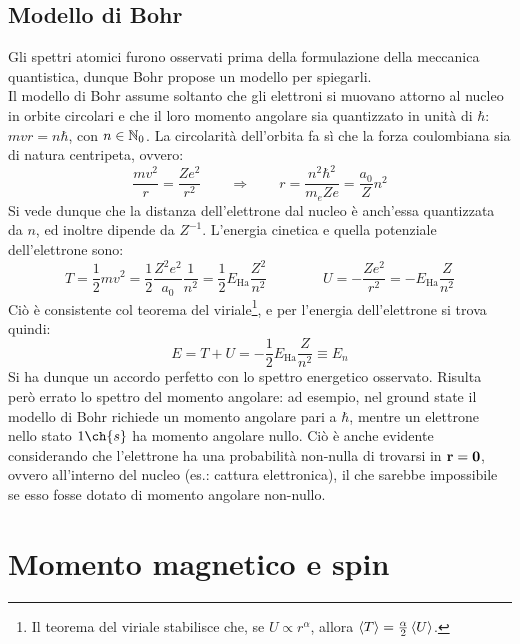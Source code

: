\subsection{Modello di Bohr}

Gli spettri atomici furono osservati prima della formulazione della meccanica quantistica, dunque Bohr propose un modello per spiegarli.\\
Il modello di Bohr assume soltanto che gli elettroni si muovano attorno al nucleo in orbite circolari e che il loro momento angolare sia quantizzato in unità di $ \hbar $: $ mvr = n\hbar $, con $ n \in \mathbb{N}_0 $. La circolarità dell'orbita fa sì che la forza coulombiana sia di natura centripeta, ovvero:
\begin{equation*}
	\frac{mv^2}{r} = \frac{Ze^2}{r^2}
	\qquad \Rightarrow \qquad
	r = \frac{n^2 \hbar^2}{m_e Z e} = \frac{a_0}{Z} n^2
\end{equation*}
Si vede dunque che la distanza dell'elettrone dal nucleo è anch'essa quantizzata da $ n $, ed inoltre dipende da $ Z^{-1} $. L'energia cinetica e quella potenziale dell'elettrone sono:
\begin{equation*}
	T = \frac{1}{2} m v^2 = \frac{1}{2} \frac{Z^2 e^2}{a_0} \frac{1}{n^2} = \frac{1}{2} E_\text{Ha} \frac{Z^2}{n^2}
	\qquad \qquad
	U = - \frac{Z e^2}{r^2} = - E_\text{Ha} \frac{Z}{n^2}
\end{equation*}
Ciò è consistente col teorema del viriale\footnote{Il teorema del viriale stabilisce che, se $ U \propto r^\alpha $, allora $ \braket{T} = \frac{\alpha}{2} \braket{U} $.}, e per l'energia dell'elettrone si trova quindi:
\begin{equation*}
	E = T + U = - \frac{1}{2} E_\text{Ha} \frac{Z}{n^2} \equiv E_n
\end{equation*}
Si ha dunque un accordo perfetto con lo spettro energetico osservato. Risulta però errato lo spettro del momento angolare: ad esempio, nel ground state il modello di Bohr richiede un momento angolare pari a $ \hbar $, mentre un elettrone nello stato $ 1\ch{s} $ ha momento angolare nullo. Ciò è anche evidente considerando che l'elettrone ha una probabilità non-nulla di trovarsi in $ \mathbf{r} = \mathbf{0} $, ovvero all'interno del nucleo (es.: cattura elettronica), il che sarebbe impossibile se esso fosse dotato di momento angolare non-nullo.

\section{Momento magnetico e spin}

